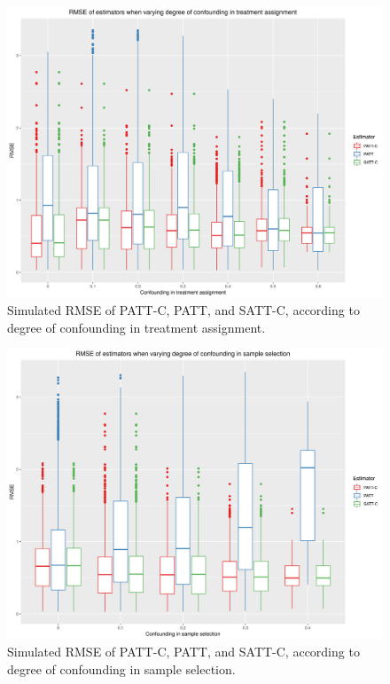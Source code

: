 \documentclass[hidelinks,12pt]{article}
\begin{document}
\begin{appendices}
\begin{figure}[htbp]
	\begin{center}
		\includegraphics[width = 1\textwidth]{rmse_boxplots_RateConT}
		\caption{Simulated RMSE of PATT-C, PATT, and SATT-C, according to degree of confounding in treatment assignment.\label{fig:rmse_boxplots_RateConT}}
	\end{center}
\end{figure}

\begin{figure}[htbp]
	\begin{center}
		\includegraphics[width = 1\textwidth]{rmse_boxplots_RateConS}
		\caption{Simulated RMSE of PATT-C, PATT, and SATT-C, according to degree of confounding in sample selection.\label{fig:rmse_boxplots_RateConS}}
	\end{center}
\end{figure}


\end{appendices}
\end{document}
